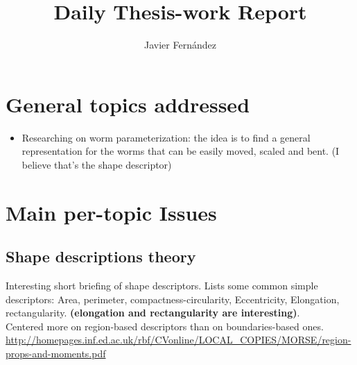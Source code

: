 \documentclass{article}
\title{Daily Thesis-work Report}
\author{Javier Fern\'andez}
\begin{document}
\maketitle

\section{General topics addressed}
\begin{itemize}
\item Researching on worm parameterization: the idea is to find a
  general representation for the worms that can be easily moved,
  scaled and bent. (I believe that's the shape descriptor)
\end{itemize}

\section{Main per-topic Issues}
\subsection{Shape descriptions theory}
Interesting short briefing of shape descriptors. Lists some common simple 
descriptors: Area, perimeter, compactness-circularity, Eccentricity, Elongation,
rectangularity. \textbf{(elongation and rectangularity are interesting)}.\\
Centered more on region-based descriptors than on boundaries-based ones.
\\
\url{http://homepages.inf.ed.ac.uk/rbf/CVonline/LOCAL_COPIES/MORSE/region-props-and-moments.pdf}
\end{document}
